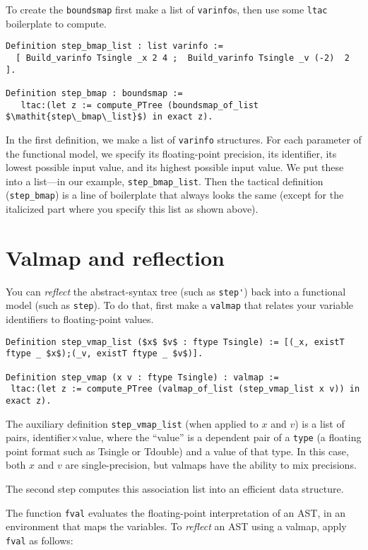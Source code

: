 \documentclass[article]{memoir}
\begin{document}
To create the \lstinline{boundsmap}
first make a list of \lstinline{varinfo}s,
then use some \lstinline{ltac} boilerplate to compute.
\begin{lstlisting}
Definition step_bmap_list : list varinfo := 
  [ Build_varinfo Tsingle _x 2 4 ;  Build_varinfo Tsingle _v (-2)  2 ].

Definition step_bmap : boundsmap :=
   ltac:(let z := compute_PTree (boundsmap_of_list $\mathit{step\_bmap\_list}$) in exact z).
\end{lstlisting}
In the first definition, we make a list of \lstinline{varinfo} structures.
For each parameter of the functional model, we specify its floating-point precision, its identifier, its lowest possible input value,
and its highest possible input value.  
We put these into a list---in our example, \lstinline{step_bmap_list}.
Then the tactical definition (\lstinline{step_bmap}) is
a line of boilerplate that always looks the same
(except for the italicized part where you specify this list
as shown above).


\chapter{Valmap and reflection}
\label{valmap}

You can \emph{reflect} the abstract-syntax tree (such as \lstinline{step'})
back into a functional model (such as \lstinline{step}).
To do that, first make a \lstinline{valmap} that relates your
variable identifiers to floating-point values.

\begin{lstlisting}
Definition step_vmap_list ($x$ $v$ : ftype Tsingle) := [(_x, existT ftype _ $x$);(_v, existT ftype _ $v$)].

Definition step_vmap (x v : ftype Tsingle) : valmap :=
 ltac:(let z := compute_PTree (valmap_of_list (step_vmap_list x v)) in exact z).
\end{lstlisting}
The auxiliary definition \lstinline{step_vmap_list}
(when applied to $x$ and $v$)
is a list of pairs, identifier$\times$value,
where the ``value'' is a dependent pair of a \lstinline{type} (a floating
point format such as Tsingle or Tdouble) and a value of that type.
In this case, both $x$ and $v$ are single-precision,
but valmaps have the ability to mix precisions.

The second step computes this association list into
an efficient data structure.

The function \lstinline{fval} evaluates the floating-point interpretation
of an AST, in an environment that maps the variables.
To \emph{reflect} an AST using a valmap, apply \lstinline{fval} as follows:
\end{document}
